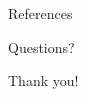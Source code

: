 \documentclass[9pt]{beamer}
\begin{document}
% 
% 
% 
% 
% 

\appendix

\begin{frame}[allowframebreaks]{References}
    \nocite{*}
    
\end{frame}

\begin{frame}[standout]
    Questions?
\end{frame}

\begin{frame}[standout]
    Thank you!
\end{frame}
\end{document}

